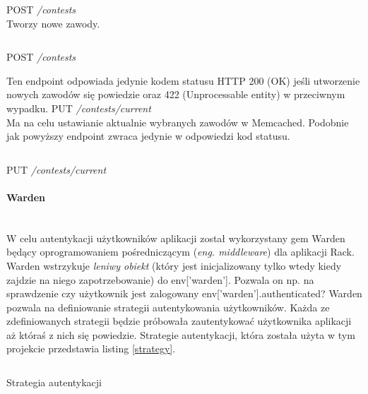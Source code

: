 \documentclass[11pt,a4paper, twoside]{article}
\begin{document}
\noindent
POST \emph{/contests}
\\
\noindent
Tworzy nowe zawody.
\begin{listing}[H]
\inputminted{ruby}{./src/contest_curl}
\caption{POST \emph{/contests}}
\end{listing}
\noindent
Ten endpoint odpowiada jedynie kodem statusu HTTP 200 (OK) jeśli utworzenie nowych zawodów się powiedzie oraz 422 (Unprocessable entity) w przeciwnym wypadku.
\newline
\newline
\noindent
PUT \emph{/contests/current}
\\
\noindent
Ma na celu ustawianie aktualnie wybranych zawodów w Memcached. Podobnie jak powyższy endpoint zwraca jedynie w odpowiedzi kod statusu.
\begin{listing}[H]
\inputminted{ruby}{./src/curl_current_contest}
\caption{PUT \emph{/contests/current}}
\end{listing}
\paragraph{Warden}\label{warden} ~\\
W celu autentykacji użytkowników aplikacji został wykorzystany gem Warden będący oprogramowaniem pośredniczącym (\emph{eng. middleware}) dla aplikacji Rack. Warden wstrzykuje \emph{leniwy obiekt} (który jest inicjalizowany tylko wtedy kiedy zajdzie na niego zapotrzebowanie) do env['warden']. Pozwala on np. na sprawdzenie czy użytkownik jest zalogowany env['warden'].authenticated? Warden pozwala na definiowanie strategii autentykowania użytkowników. Każda ze zdefiniowanych strategii będzie próbowała zautentykować użytkownika aplikacji aż któraś z nich się powiedzie. Strategie autentykacji, która została użyta w tym projekcie przedstawia listing \ref{strategy}.

\begin{listing}[H]
\inputminted[linenos=true]{ruby}{./src/warden_strategy.rb}
\caption{Strategia autentykacji}
$\label{strategy}$
\end{listing}
\newpage
\end{document}
